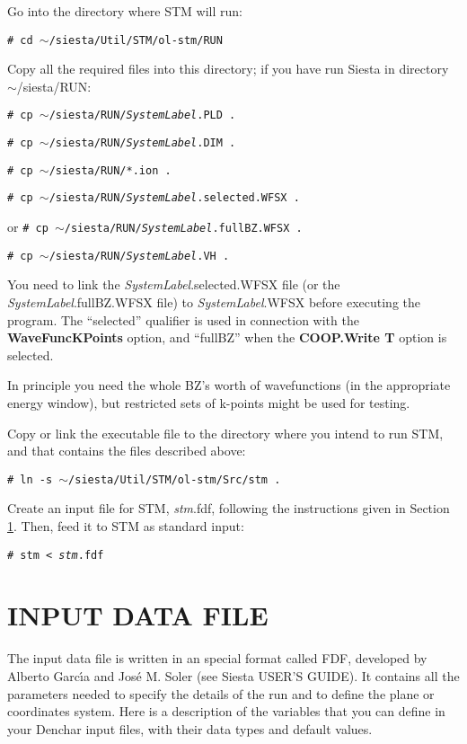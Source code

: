  Go into the directory where {\sc STM} will run:

 {\tt \# cd $\sim$/siesta/Util/STM/ol-stm/RUN}

 Copy all the required files into this directory; if you
 have run {\sc Siesta} in directory $\sim$/siesta/RUN:

 {\tt \# cp $\sim$/siesta/RUN/{\it SystemLabel}.PLD .}

 {\tt \# cp $\sim$/siesta/RUN/{\it SystemLabel}.DIM .}

 {\tt \# cp $\sim$/siesta/RUN/*.ion .}

 {\tt \# cp $\sim$/siesta/RUN/{\it SystemLabel}.selected.WFSX .}

 or  {\tt \# cp $\sim$/siesta/RUN/{\it SystemLabel}.fullBZ.WFSX .}

 {\tt \# cp $\sim$/siesta/RUN/{\it SystemLabel}.VH .}

 You need to link the {\it SystemLabel}.selected.WFSX file (or the
 {\it SystemLabel}.fullBZ.WFSX file) to {\it SystemLabel}.WFSX before
 executing the program. The ``selected'' qualifier is used in
 connection with the {\bf WaveFuncKPoints} option, and ``fullBZ'' when
 the {\bf COOP.Write T} option is selected.

 In principle you need the whole BZ's worth of wavefunctions (in the
 appropriate energy window), but restricted sets of k-points might be
 used for testing.
      
 Copy or link the executable file to the directory
 where you intend to run  {\sc STM}, and that
 contains the files described above:

 {\tt \# ln -s $\sim$/siesta/Util/STM/ol-stm/Src/stm . }

 Create an input file for {\sc STM}, {\it stm}.fdf, following the 
 instructions given in Section \ref{cap:input}. Then,
 feed it to  {\sc STM} as standard input:

 {\tt \# stm < {\it stm}.fdf } 

\section{INPUT DATA FILE}
\label{cap:input} 

The input data file is written in an special format called FDF, developed
by Alberto Garc\'{\i}a and Jos\'e M. Soler (see {\sc Siesta} USER'S GUIDE).
It contains all the parameters needed to specify the details
of the run and to define the plane or coordinates system.
Here is a description of the variables that you can define in your 
{\sc Denchar} input files,
with their data types and default values.

